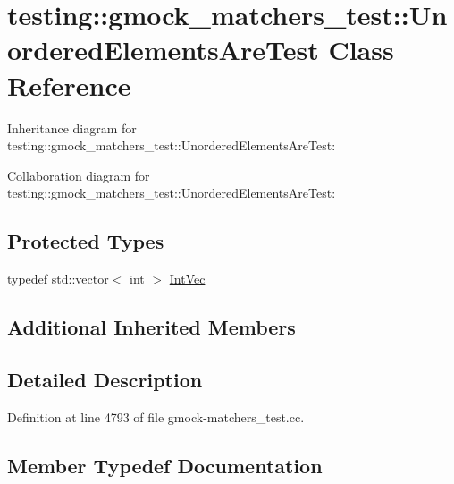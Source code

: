 \hypertarget{classtesting_1_1gmock__matchers__test_1_1_unordered_elements_are_test}{}\section{testing\+:\+:gmock\+\_\+matchers\+\_\+test\+:\+:Unordered\+Elements\+Are\+Test Class Reference}
\label{classtesting_1_1gmock__matchers__test_1_1_unordered_elements_are_test}


Inheritance diagram for testing\+:\+:gmock\+\_\+matchers\+\_\+test\+:\+:Unordered\+Elements\+Are\+Test\+:


Collaboration diagram for testing\+:\+:gmock\+\_\+matchers\+\_\+test\+:\+:Unordered\+Elements\+Are\+Test\+:
\subsection*{Protected Types}
\begin{DoxyCompactItemize}
\item 
typedef std\+::vector$<$ int $>$ \hyperlink{classtesting_1_1gmock__matchers__test_1_1_unordered_elements_are_test_a608750c71652943bd11fe7bb5281588d}{Int\+Vec}
\end{DoxyCompactItemize}
\subsection*{Additional Inherited Members}


\subsection{Detailed Description}


Definition at line 4793 of file gmock-\/matchers\+\_\+test.\+cc.



\subsection{Member Typedef Documentation}
